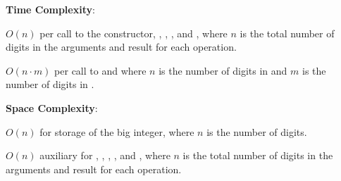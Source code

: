 \textbf{Time Complexity}:
\begin{compactitem}
  \item $O(n)$ per call to the constructor, , , , and , where $n$ is the total number of digits in the arguments and result for each operation.
  \item $O(n \cdot m)$ per call to  and  where $n$ is the number of digits in  and $m$ is the number of digits in .
\end{compactitem}

\textbf{Space Complexity}:
\begin{compactitem}
  \item $O(n)$ for storage of the big integer, where $n$ is the number of digits.
  \item $O(n)$ auxiliary for , , , , and , where $n$ is the total number of digits in the arguments and result for each operation.
\end{compactitem}

